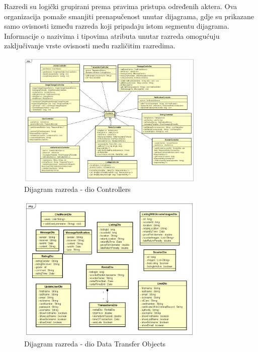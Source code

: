 			\indent Razredi su logički grupirani prema pravima pristupa određenih aktera. Ova organizacija pomaže smanjiti prenapučenost unutar dijagrama, gdje su prikazane samo ovisnosti između razreda koji pripadaju istom segmentu dijagrama. Informacije o nazivima i tipovima atributa unutar razreda omogućuju zaključivanje vrste ovisnosti među različitim razredima. \\
		
			\begin{figure}[H]
				\centering
				\includegraphics[width=0.8\textwidth]{dijagrami/ControllersDiagram.png}
				\caption{Dijagram razreda - dio Controllers}
				\label{fig:your_label}
			\end{figure}
			
			\begin{figure}[H]
				\centering
				\includegraphics[width=0.8\textwidth]{dijagrami/DTO_dijagram.png}
				\caption{Dijagram razreda - dio Data Transfer Objects}
				\label{fig:your_label}
			\end{figure}
			
